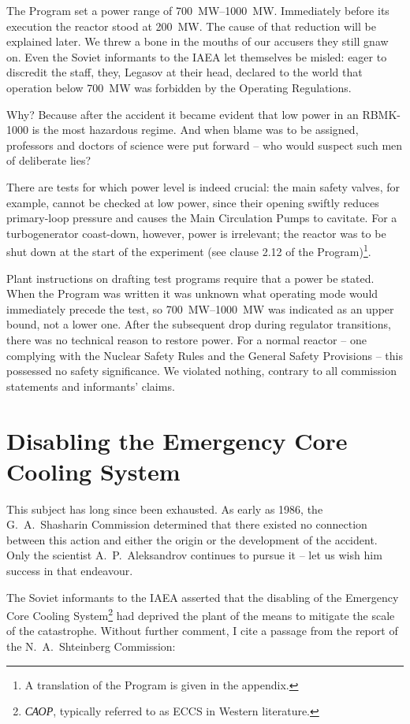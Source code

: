 \documentclass[openright]{bookest}
\begin{document}
The Program set a power range of \qtyrange{700}{1000}{\mega\watt}. Immediately before its execution the reactor stood at \qty{200}{\mega\watt}. The cause of that reduction will be explained later. We threw a bone in the mouths of our accusers they still gnaw on. Even the Soviet informants to the IAEA let themselves be misled: eager to discredit the staff, they, Legasov at their head, declared to the world that operation below \qty{700}{\mega\watt} was forbidden by the Operating Regulations.

Why? Because after the accident it became evident that low power in an RBMK-1000 is the most hazardous regime. And when blame was to be assigned, professors and doctors of science were put forward -- who would suspect such men of deliberate lies?

There are tests for which power level is indeed crucial: the main safety valves, for example, cannot be checked at low power, since their opening swiftly reduces primary-loop pressure and causes the Main Circulation Pumps to cavitate. For a turbogenerator coast-down, however, power is irrelevant; the reactor was to be shut down at the start of the experiment (see clause 2.12 of the Program)\footnote{A translation of the Program is given in the appendix.}.

Plant instructions on drafting test programs require that a power be stated. When the Program was written it was unknown what operating mode would immediately precede the test, so \qtyrange{700}{1000}{\mega\watt} was indicated as an upper bound, not a lower one. After the subsequent drop during regulator transitions, there was no technical reason to restore power. For a normal reactor -- one complying with the Nuclear Safety Rules and the General Safety Provisions -- this possessed no safety significance. We violated nothing, contrary to all commission statements and informants' claims.

\section{Disabling the Emergency Core Cooling System}

This subject has long since been exhausted. As early as 1986, the G.~A.~Shasharin Commission determined that there existed no connection between this action and either the origin or the development of the accident. Only the scientist A.~P.~Aleksandrov continues to pursue it -- let us wish him success in that endeavour.

The Soviet informants to the IAEA asserted that the disabling of the Emergency Core Cooling System\footnote{\textit{САОР}, typically referred to as ECCS in Western literature.} had deprived the plant of the means to mitigate the scale of the catastrophe. Without further comment, I cite a passage from the report of the N.~A.~Shteinberg Commission:
\end{document}
